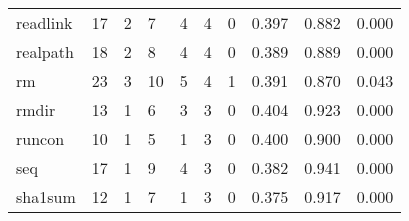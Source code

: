 \begin{longtable}{lp{1.3cm}p{1.3cm}p{1.3cm}p{1.3cm}p{1.3cm}p{1.3cm}p{1.3cm}p{1.3cm}p{1.3cm}}
readlink  &                     17 &                                             2 &                                            7 &                                           4 &                                            4 &                                          0 &                                0.397 &                                  0.882 &                                0.000 \\
realpath  &                     18 &                                             2 &                                            8 &                                           4 &                                            4 &                                          0 &                                0.389 &                                  0.889 &                                0.000 \\
rm        &                     23 &                                             3 &                                           10 &                                           5 &                                            4 &                                          1 &                                0.391 &                                  0.870 &                                0.043 \\
rmdir     &                     13 &                                             1 &                                            6 &                                           3 &                                            3 &                                          0 &                                0.404 &                                  0.923 &                                0.000 \\
runcon    &                     10 &                                             1 &                                            5 &                                           1 &                                            3 &                                          0 &                                0.400 &                                  0.900 &                                0.000 \\
seq       &                     17 &                                             1 &                                            9 &                                           4 &                                            3 &                                          0 &                                0.382 &                                  0.941 &                                0.000 \\
sha1sum   &                     12 &                                             1 &                                            7 &                                           1 &                                            3 &                                          0 &                                0.375 &                                  0.917 &                                0.000 \\

\end{longtable}
